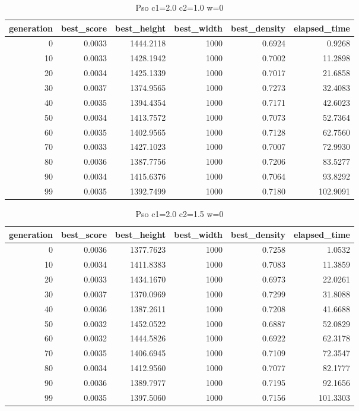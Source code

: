 \begin{table}[htbp]
    \centering
    \caption{Pso c1=2.0 c2=1.0 w=0}
    \label{tab:pso_c1_2_0_c2_1_0_w_0}
    \begin{tabular}{rrrrrr}
    \toprule
    generation & best_score & best_height & best_width & best_density & elapsed_time \\
    \midrule
    0 & 0.0033 & 1444.2118 & 1000 & 0.6924 & 0.9268 \\
    10 & 0.0033 & 1428.1942 & 1000 & 0.7002 & 11.2898 \\
    20 & 0.0034 & 1425.1339 & 1000 & 0.7017 & 21.6858 \\
    30 & 0.0037 & 1374.9565 & 1000 & 0.7273 & 32.4083 \\
    40 & 0.0035 & 1394.4354 & 1000 & 0.7171 & 42.6023 \\
    50 & 0.0034 & 1413.7572 & 1000 & 0.7073 & 52.7364 \\
    60 & 0.0035 & 1402.9565 & 1000 & 0.7128 & 62.7560 \\
    70 & 0.0033 & 1427.1023 & 1000 & 0.7007 & 72.9930 \\
    80 & 0.0036 & 1387.7756 & 1000 & 0.7206 & 83.5277 \\
    90 & 0.0034 & 1415.6376 & 1000 & 0.7064 & 93.8292 \\
    99 & 0.0035 & 1392.7499 & 1000 & 0.7180 & 102.9091 \\
    \bottomrule
    \end{tabular}
\end{table}


\begin{table}[htbp]
    \centering
    \caption{Pso c1=2.0 c2=1.5 w=0}
    \label{tab:pso_c1_2_0_c2_1_5_w_0}
    \begin{tabular}{rrrrrr}
    \toprule
    generation & best_score & best_height & best_width & best_density & elapsed_time \\
    \midrule
    0 & 0.0036 & 1377.7623 & 1000 & 0.7258 & 1.0532 \\
    10 & 0.0034 & 1411.8383 & 1000 & 0.7083 & 11.3859 \\
    20 & 0.0033 & 1434.1670 & 1000 & 0.6973 & 22.0261 \\
    30 & 0.0037 & 1370.0969 & 1000 & 0.7299 & 31.8088 \\
    40 & 0.0036 & 1387.2611 & 1000 & 0.7208 & 41.6688 \\
    50 & 0.0032 & 1452.0522 & 1000 & 0.6887 & 52.0829 \\
    60 & 0.0032 & 1444.5826 & 1000 & 0.6922 & 62.3178 \\
    70 & 0.0035 & 1406.6945 & 1000 & 0.7109 & 72.3547 \\
    80 & 0.0034 & 1412.9560 & 1000 & 0.7077 & 82.1777 \\
    90 & 0.0036 & 1389.7977 & 1000 & 0.7195 & 92.1656 \\
    99 & 0.0035 & 1397.5060 & 1000 & 0.7156 & 101.3303 \\
    \bottomrule
    \end{tabular}
\end{table}


